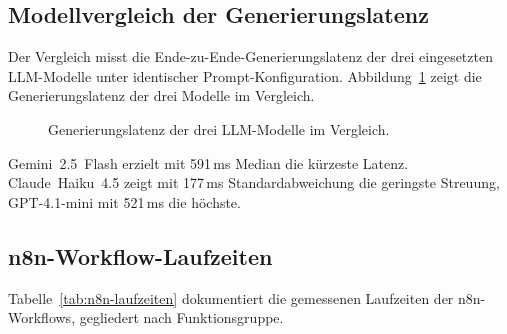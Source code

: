 \subsection{Modellvergleich der Generierungslatenz}\label{modellvergleich-latenz}\label{systemlatenz}

Der Vergleich misst die Ende-zu-Ende-Generierungslatenz der drei eingesetzten LLM-Modelle unter identischer Prompt-Konfiguration. Abbildung~\ref{fig:latenz-modelle} zeigt die Generierungslatenz der drei Modelle im Vergleich.

\begin{figure}[H]
\centering
\DiagramLatenzModelle
\caption[Generierungslatenz der drei LLM-Modelle]{Generierungslatenz der drei LLM-Modelle im Vergleich.}
\label{fig:latenz-modelle}
\end{figure}

Gemini~2.5~Flash erzielt mit 591\,ms Median die kürzeste Latenz. Claude~Haiku~4.5 zeigt mit 177\,ms Standardabweichung die geringste Streuung, GPT-4.1-mini mit 521\,ms die höchste.

\subsection{n8n-Workflow-Laufzeiten}\label{ttp-abschaetzung}

Tabelle~\ref{tab:n8n-laufzeiten} dokumentiert die gemessenen Laufzeiten der n8n-Workflows, gegliedert nach Funktionsgruppe.

